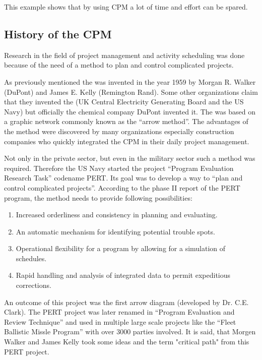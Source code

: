 This example shows that by using CPM a lot of time and effort can be spared. 

\subsection{History of the CPM}

Research in the field of project management and activity scheduling was done because of the need of
a method to plan and control complicated projects. 

As previously mentioned the \cpm{} was invented in the year 1959 by Morgan R. Walker
(DuPont) and James E. Kelly (Remington Rand).  Some other organizations claim that they invented the
\cpm{} (UK Central Electricity Generating Board and the US Navy) but officially the
chemical company DuPont invented it. The \cpm{} was based on a graphic network
commonly known as the “arrow method”.  The advantages of the \cpm{} method were discovered by
many organizations especially construction companies who quickly integrated the CPM in their daily
project management. 

Not only in the private sector, but even in the military sector such a method was required.
Therefore the US Navy started the project “Program Evaluation Research Task” codename PERT. Its goal
was to develop a way to “plan and control complicated projects”. According to the phase II report of
the PERT program, the method needs to provide following possibilities:

\begin{enumerate}
  \item Increased orderliness and consistency in planning and evaluating.
  \item An automatic mechanism for identifying potential trouble spots.
  \item Operational flexibility for a program by allowing for a simulation    of schedules.
  \item Rapid handling and analysis of integrated data to permit expeditious corrections.
\end{enumerate}

An outcome of this project was the first arrow diagram (developed by Dr. C.E. Clark). The PERT
project was later renamed in “Program Evaluation and Review Technique” and used in multiple large
scale projects like the “Fleet Ballistic Missle Program” with over 3000 parties involved. It is
said, that Morgen Walker and James Kelly took some ideas and the term "critical path" from this PERT
project\cite[p. 10]{obrien}.

